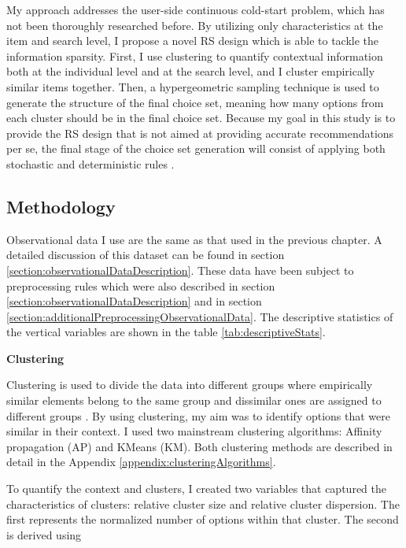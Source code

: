 \documentclass[a4paper,12pt]{article}
\begin{document}
My approach addresses the user-side continuous cold-start problem, which has not been thoroughly researched before. By utilizing only characteristics at the item and search level, I propose a novel RS design which is able to tackle the information sparsity. First, I use clustering \citep{rokach2005clustering} to quantify contextual information both at the individual level and at the search level, and I cluster empirically similar items together. Then, a hypergeometric sampling technique is used to generate the structure of the final choice set, meaning how many options from each cluster should be in the final choice set. Because my goal in this study is to provide the RS design that is not aimed at providing accurate recommendations per se, the final stage of the choice set generation will consist of applying both stochastic \citep{mcfadden1973conditional, urban1984testing} and deterministic rules \citep{hauser2014consideration, lee2004effect, coombs1951mathematical}.

\subsection{Methodology}

Observational data I use are the same as that used in the previous chapter. A detailed discussion of this dataset can be found in section \ref{section:observationalDataDescription}. These data have been subject to preprocessing rules which were also described in section \ref{section:observationalDataDescription} and in section \ref{section:additionalPreprocessingObservationalData}. The descriptive statistics of the vertical variables are shown in the table \ref{tab:descriptiveStats}.

\textbf{Clustering}

Clustering is used to divide the data into different groups where empirically similar elements belong to the same group and dissimilar ones are assigned to different groups \citep{rokach2005clustering}. By using clustering, my aim was to identify options that were similar in their context. I used two mainstream clustering algorithms: Affinity propagation (AP) and KMeans (KM). Both clustering methods are described in detail in the Appendix \ref{appendix:clusteringAlgorithms}.

To quantify the context and clusters, I created two variables that captured the characteristics of clusters: relative cluster size and relative cluster dispersion. The first represents the normalized number of options within that cluster. The second is derived using
\end{document}
